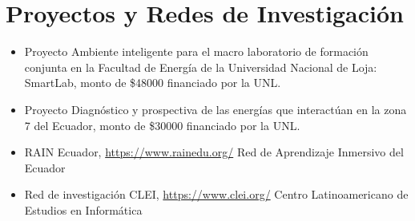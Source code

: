 \documentclass[]{cv-style} %
\begin{document}
\nocite{9582635} \nocite{CalderonOrdonez}
\nocite{Cumbicus-Pineda2019}\nocite{MallaSanchez}\nocite{DarwinGualotuna}\nocite{Ordonez-Ordonez2019}\nocite{Ordonez-Ordonez2019a}\nocite{Ordonez-Ordonez2020}\nocite{pineda2014identificacion}\nocite{RivasEcheverria}

 

\section{Proyectos y Redes de Investigación}
\vspace{-0.3cm}
\begin{itemize}
    \item  \small Proyecto Ambiente inteligente para el macro laboratorio de formación conjunta en la Facultad de Energía de la Universidad Nacional de Loja: SmartLab, monto de \$48000 financiado por la UNL.
    \item \small Proyecto Diagnóstico y prospectiva de las energías que interactúan en la zona 7 del Ecuador, monto de \$30000 financiado por la UNL.
    \item \small RAIN Ecuador, \url{https://www.rainedu.org/} Red de Aprendizaje Inmersivo del Ecuador
    \item \small Red de investigación CLEI, \url{https://www.clei.org/} Centro Latinoamericano de Estudios en Informática
\end{itemize}
\end{document}
